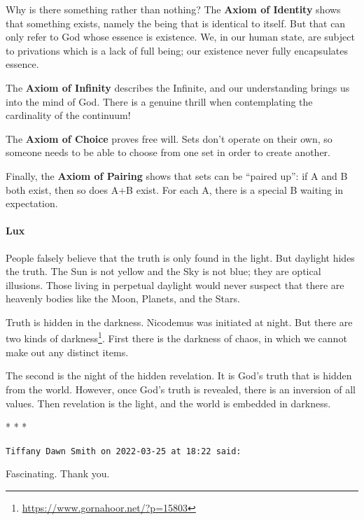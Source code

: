 Why is there something rather than nothing? The \textbf{Axiom of Identity} shows that something exists, namely the being that is identical to itself. But that can only refer to God whose essence is existence. We, in our human state, are subject to privations which is a lack of full being; our existence never fully encapsulates essence.

The \textbf{Axiom of Infinity} describes the Infinite, and our understanding brings us into the mind of God. There is a genuine thrill when contemplating the cardinality of the continuum!

The \textbf{Axiom of Choice} proves free will. Sets don't operate on their own, so someone needs to be able to choose from one set in order to create another.

Finally, the \textbf{Axiom of Pairing} shows that sets can be ``paired up'': if A and B both exist, then so does A+B exist. For each A, there is a special B waiting in expectation.

\paragraph{Lux}


People falsely believe that the truth is only found in the light. But daylight hides the truth. The Sun is not yellow and the Sky is not blue; they are optical illusions. Those living in perpetual daylight would never suspect that there are heavenly bodies like the Moon, Planets, and the Stars.

Truth is hidden in the darkness. Nicodemus was initiated at night. But there are two kinds of darkness\footnote{\url{https://www.gornahoor.net/?p=15803}}. First there is the darkness of chaos, in which we cannot make out any distinct items.

The second is the night of the hidden revelation. It is God's truth that is hidden from the world. However, once God's truth is revealed, there is an inversion of all values. Then revelation is the light, and the world is embedded in darkness.



\begin{center}* * *\end{center}

\begin{footnotesize}
\begin{sffamily}
\texttt{Tiffany Dawn Smith on 2022-03-25 at 18:22 said:}

Fascinating. Thank you.

\end{sffamily}
\end{footnotesize}


